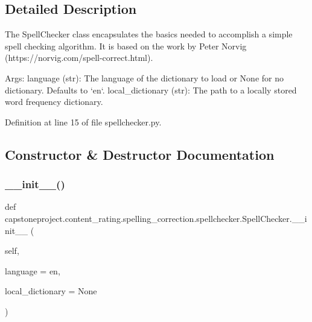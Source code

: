 \subsection{Detailed Description}
\begin{DoxyVerb}The SpellChecker class encapsulates the basics needed to accomplish a simple spell checking algorithm.
It is based on the work by Peter Norvig (https://norvig.com/spell-correct.html).

    Args:
        language (str): The language of the dictionary to load or None for no dictionary. Defaults to `en`.
        local_dictionary (str): The path to a locally stored word frequency dictionary.
\end{DoxyVerb}
 

Definition at line 15 of file spellchecker.\+py.



\subsection{Constructor \& Destructor Documentation}
\mbox{\label{classcapstoneproject_1_1content__rating_1_1spelling__correction_1_1spellchecker_1_1_spell_checker_a6ec738f704c42932bedb9d09be9392dc}} 
\subsubsection{\texorpdfstring{\+\_\+\+\_\+init\+\_\+\+\_\+()}{\_\_init\_\_()}}
{\footnotesize\ttfamily def capstoneproject.\+content\+\_\+rating.\+spelling\+\_\+correction.\+spellchecker.\+Spell\+Checker.\+\_\+\+\_\+init\+\_\+\+\_\+ (\begin{DoxyParamCaption}\item[{}]{self,  }\item[{}]{language = {\ttfamily \textquotesingle{}en\textquotesingle{}},  }\item[{}]{local\+\_\+dictionary = {\ttfamily None} }\end{DoxyParamCaption})}

